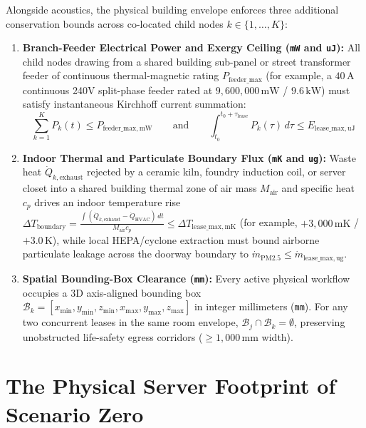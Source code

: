 Alongside acoustics, the physical building envelope enforces three additional conservation bounds across co-located child nodes $k \in \{1,\dots,K\}$:
\begin{enumerate}
    \item \textbf{Branch-Feeder Electrical Power and Exergy Ceiling (\texttt{mW} and \texttt{uJ}):} All child nodes drawing from a shared building sub-panel or street transformer feeder of continuous thermal-magnetic rating $P_{\mathrm{feeder\_max}}$ (for example, a $40\,\mathrm{A}$ continuous 240V split-phase feeder rated at $9{,}600{,}000\,\mathrm{mW}$ / $9.6\,\mathrm{kW}$) must satisfy instantaneous Kirchhoff current summation:
    \begin{equation}
    \sum_{k=1}^{K} P_k(t) \le P_{\mathrm{feeder\_max,mW}} \qquad \text{and} \qquad \int_{t_0}^{t_0 + \tau_{\mathrm{lease}}} P_k(\tau)\,d\tau \le E_{\mathrm{lease\_max,uJ}}
    \label{eq:l1_envelope_power_bound}
    \end{equation}
    \item \textbf{Indoor Thermal and Particulate Boundary Flux (\texttt{mK} and \texttt{ug}):} Waste heat $\dot{Q}_{k,\mathrm{exhaust}}$ rejected by a ceramic kiln, foundry induction coil, or server closet into a shared building thermal zone of air mass $M_{\mathrm{air}}$ and specific heat $c_p$ drives an indoor temperature rise $\Delta T_{\mathrm{boundary}} = \frac{\int (\dot{Q}_{k,\mathrm{exhaust}} - \dot{Q}_{\mathrm{HVAC}})\,dt}{M_{\mathrm{air}} c_p} \le \Delta T_{\mathrm{lease\_max,mK}}$ (for example, $+3{,}000\,\mathrm{mK}$ / $+3.0\,\mathrm{K}$), while local HEPA/cyclone extraction must bound airborne particulate leakage across the doorway boundary to $\dot{m}_{\mathrm{PM2.5}} \le \dot{m}_{\mathrm{lease\_max,ug}}$.
    \item \textbf{Spatial Bounding-Box Clearance (\texttt{mm}):} Every active physical workflow occupies a 3D axis-aligned bounding box $\mathcal{B}_k = [x_{\min}, y_{\min}, z_{\min}, x_{\max}, y_{\max}, z_{\max}]$ in integer millimeters (\texttt{mm}). For any two concurrent leases in the same room envelope, $\mathcal{B}_j \cap \mathcal{B}_k = \emptyset$, preserving unobstructed life-safety egress corridors ($\ge 1{,}000\,\mathrm{mm}$ width).
\end{enumerate}

\section{The Physical Server Footprint of Scenario Zero}
\label{sec:l1_scenario_zero_footprint}

